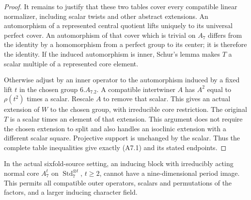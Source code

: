 \begin{proof}
It remains to justify that these two tables cover every compatible
linear normalizer, including scalar twists and other abstract
extensions. An automorphism of a represented central quotient
lifts uniquely to its universal perfect cover. An automorphism
of that cover which is trivial on $A_7$ differs from the identity
by a homomorphism from a perfect group to its center; it is therefore
the identity. If the induced automorphism is inner, Schur's lemma
makes $T$ a scalar multiple of a represented core element.

Otherwise adjust by an inner operator to the automorphism induced
by a fixed lift $t$ in the chosen group $6.A_7.2$. A compatible
intertwiner $A$ has $A^2$ equal to $\rho(t^2)$ times a scalar.
Rescale $A$ to remove that scalar. This gives an actual extension
of $W$ to the chosen group, with irreducible core restriction.
The original $T$ is a scalar times an element of that extension.
This argument does not require the chosen extension to split and
also handles an isoclinic extension with a different scalar square.
Projective support is unchanged by the scalar. Thus the complete
table inequalities give exactly (A7.1) and its stated endpoints.
\end{proof}

\begin{lemma}
\label{D-A7-02}
In the actual sixfold-source setting, an inducing block with
irreducibly acting normal core $A_7^t$ on
$\operatorname{Std}_7^{\otimes t}$, $t\ge2$, cannot have a
nine-dimensional period image. This permits all compatible outer
operators, scalars and permutations of the factors, and a larger
inducing character field.
\end{lemma}

